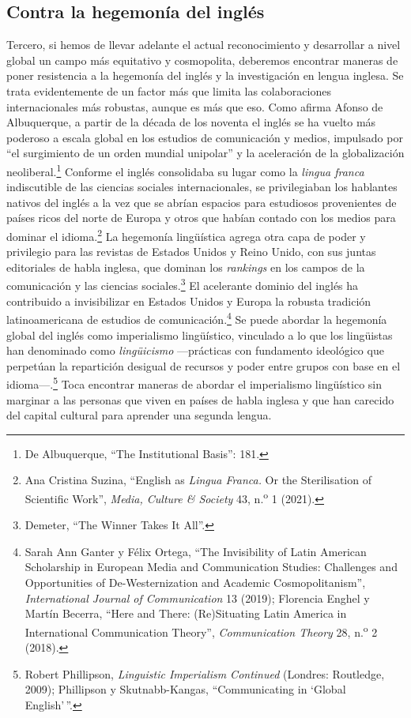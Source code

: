 \documentclass{tufte-handout}
\begin{document}
\hypertarget{contra-la-hegemonuxeda-del-ingluxe9s}{%
\subsection{Contra la hegemonía del
inglés}\label{contra-la-hegemonuxeda-del-ingluxe9s}}

Tercero, si hemos de llevar adelante el actual reconocimiento y
desarrollar a nivel global un campo más equitativo y cosmopolita,
deberemos encontrar maneras de poner resistencia a la hegemonía del
inglés y la investigación en lengua inglesa. Se trata evidentemente de
un factor más que limita las colaboraciones internacionales más
robustas, aunque es más que eso. Como afirma Afonso de Albuquerque, a
partir de la década de los noventa el inglés se ha vuelto más poderoso a
escala global en los estudios de comunicación y medios, impulsado por
``el surgimiento de un orden mundial unipolar'' y la aceleración de la
globalización neoliberal.\footnote{De Albuquerque, ``The Institutional
  Basis'': 181.} Conforme el inglés consolidaba su lugar como la
\emph{lingua franca} indiscutible de las ciencias sociales
internacionales, se privilegiaban los hablantes nativos del inglés a la
vez que se abrían espacios para estudiosos provenientes de países ricos
del norte de Europa y otros que habían contado con los medios para
dominar el idioma.\footnote{Ana Cristina Suzina, ``English as
  \emph{Lingua Franca.} Or the Sterilisation of Scientific Work'',
  \emph{Media, Culture \& Society} 43, n.\textsuperscript{o} 1 (2021).}
La hegemonía lingüística agrega otra capa de poder y privilegio para las
revistas de Estados Unidos y Reino Unido, con sus juntas editoriales de
habla inglesa, que dominan los \emph{rankings} en los campos de la
comunicación y las ciencias sociales.\footnote{Demeter, ``The Winner
  Takes It All''.} El acelerante dominio del inglés ha contribuido a
invisibilizar en Estados Unidos y Europa la robusta tradición
latinoamericana de estudios de comunicación.\footnote{Sarah Ann Ganter y
  Félix Ortega, ``The Invisibility of Latin American Scholarship in
  European Media and Communication Studies: Challenges and Opportunities
  of De-Westernization and Academic Cosmopolitanism'',
  \emph{International Journal of Communication} 13 (2019); Florencia
  Enghel y Martín Becerra, ``Here and There: (Re)Situating Latin America
  in International Communication Theory'', \emph{Communication Theory}
  28, n.\textsuperscript{o} 2 (2018).} Se puede abordar la hegemonía
global del inglés como imperialismo lingüístico, vinculado a lo que los
lingüistas han denominado como \emph{lingüicismo} ---prácticas con
fundamento ideológico que perpetúan la repartición desigual de recursos
y poder entre grupos con base en el idioma---.\footnote{Robert
  Phillipson, \emph{Linguistic Imperialism Continued} (Londres:
  Routledge, 2009); Phillipson y Skutnabb-Kangas, ``Communicating in
  `Global English'\,''.} Toca encontrar maneras de abordar el
imperialismo lingüístico sin marginar a las personas que viven en países
de habla inglesa y que han carecido del capital cultural para aprender
una segunda lengua.
\end{document}
